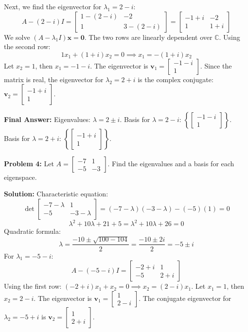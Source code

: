 \documentclass[11pt, letterpaper]{article}
\theoremstyle{definition}
\theoremstyle{remark}
\begin{document}
Next, we find the eigenvector for $\lambda_1 = 2 - i$:
\[
A - (2 - i)I = \begin{bmatrix} 1 - (2 - i) & -2 \\ 1 & 3 - (2 - i) \end{bmatrix} = \begin{bmatrix} -1 + i & -2 \\ 1 & 1 + i \end{bmatrix}
\]
We solve $(A - \lambda_1 I)\mathbf{x} = \mathbf{0}$. The two rows are linearly dependent over $\mathbb{C}$. Using the second row:
\[
1x_1 + (1 + i)x_2 = 0 \implies x_1 = -(1 + i)x_2
\]
Let $x_2 = 1$, then $x_1 = -1 - i$. The eigenvector is $\mathbf{v}_1 = \begin{bmatrix} -1 - i \\ 1 \end{bmatrix}$.
Since the matrix is real, the eigenvector for $\lambda_2 = 2 + i$ is the complex conjugate: $\mathbf{v}_2 = \begin{bmatrix} -1 + i \\ 1 \end{bmatrix}$.

\textbf{Final Answer:} 
Eigenvalues: $\lambda = 2 \pm i$. 
Basis for $\lambda = 2 - i$: $\left\{ \begin{bmatrix} -1 - i \\ 1 \end{bmatrix} \right\}$. 
Basis for $\lambda = 2 + i$: $\left\{ \begin{bmatrix} -1 + i \\ 1 \end{bmatrix} \right\}$.

\vspace{1em}

\textbf{Problem 4:} Let $A = \begin{bmatrix} -7 & 1 \\ -5 & -3 \end{bmatrix}$. Find the eigenvalues and a basis for each eigenspace.

\textbf{Solution:}
Characteristic equation:
\[
\det \begin{bmatrix} -7 - \lambda & 1 \\ -5 & -3 - \lambda \end{bmatrix} = (-7 - \lambda)(-3 - \lambda) - (-5)(1) = 0
\]
\[
\lambda^2 + 10\lambda + 21 + 5 = \lambda^2 + 10\lambda + 26 = 0
\]
Quadratic formula:
\[
\lambda = \frac{-10 \pm \sqrt{100 - 104}}{2} = \frac{-10 \pm 2i}{2} = -5 \pm i
\]
For $\lambda_1 = -5 - i$:
\[
A - (-5 - i)I = \begin{bmatrix} -2 + i & 1 \\ -5 & 2 + i \end{bmatrix}
\]
Using the first row: $(-2 + i)x_1 + x_2 = 0 \implies x_2 = (2 - i)x_1$.
Let $x_1 = 1$, then $x_2 = 2 - i$. The eigenvector is $\mathbf{v}_1 = \begin{bmatrix} 1 \\ 2 - i \end{bmatrix}$.
The conjugate eigenvector for $\lambda_2 = -5 + i$ is $\mathbf{v}_2 = \begin{bmatrix} 1 \\ 2 + i \end{bmatrix}$.
\end{document}
